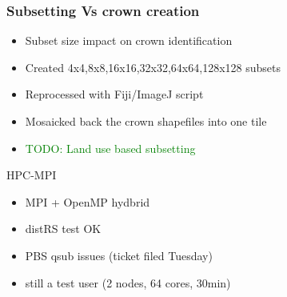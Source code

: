 \documentclass[serif,mathserif,aspectratio=169]{beamer}
\begin{document}

\begin{frame}
  \frametitle{Subsetting Vs crown creation}
\begin{center}
\begin{itemize}
 \item Subset size impact on crown identification
 \item Created 4x4,8x8,16x16,32x32,64x64,128x128 subsets
 \item Reprocessed with Fiji/ImageJ script
 \item Mosaicked back the crown shapefiles into one tile
 \item \textcolor{green}{TODO: Land use based subsetting}
\end{itemize}
\end{center}
\end{frame}


{
\begin{frame}[plain]
\begin{shaded}
\Huge HPC-MPI
\end{shaded}
\end{frame}}


\begin{frame}
\begin{center}
\begin{itemize}
 \item MPI + OpenMP hydbrid
 \item distRS test OK
 \item PBS qsub issues (ticket filed Tuesday)
 \item still a test user (2 nodes, 64 cores, 30min)
\end{itemize}
\end{center}
\end{frame}
\end{document}
